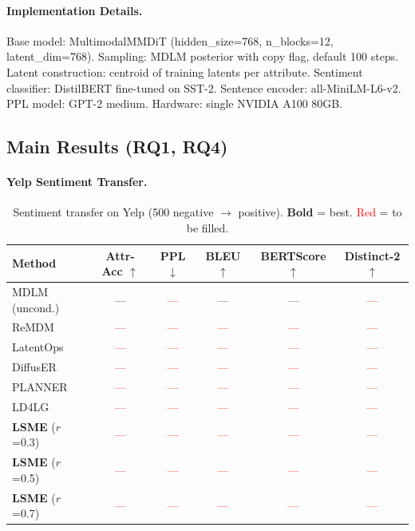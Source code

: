 \documentclass{article}
\newcommand{\tbd}[1]{\textcolor{red}{#1}}  %
\newcommand{\best}[1]{\textbf{#1}}          %
\begin{document}
\paragraph{Implementation Details.}
Base model: MultimodalMMDiT (hidden\_size=768, n\_blocks=12, latent\_dim=768).
Sampling: MDLM posterior with copy flag, default 100 steps.
Latent construction: centroid of training latents per attribute.
Sentiment classifier: DistilBERT fine-tuned on SST-2.
Sentence encoder: all-MiniLM-L6-v2.
PPL model: GPT-2 medium.
Hardware: single NVIDIA A100 80GB.

\subsection{Main Results (RQ1, RQ4)}
\label{sec:main_results}


\paragraph{Yelp Sentiment Transfer.}

\begin{table}[t]
\centering
\caption{Sentiment transfer on Yelp (500 negative $\to$ positive). \best{Bold} = best. \tbd{Red} = to be filled.}
\label{tab:yelp_results}
\small
\begin{tabular}{lccccc}
\toprule
\textbf{Method} & \textbf{Attr-Acc} $\uparrow$ & \textbf{PPL} $\downarrow$ & \textbf{BLEU} $\uparrow$ & \textbf{BERTScore} $\uparrow$ & \textbf{Distinct-2} $\uparrow$ \\
\midrule
MDLM (uncond.) & --- & \tbd{---} & --- & --- & \tbd{---} \\
ReMDM & \tbd{---} & \tbd{---} & \tbd{---} & \tbd{---} & \tbd{---} \\
LatentOps & \tbd{---} & \tbd{---} & \tbd{---} & \tbd{---} & \tbd{---} \\
DiffusER & \tbd{---} & \tbd{---} & \tbd{---} & \tbd{---} & \tbd{---} \\
PLANNER & \tbd{---} & \tbd{---} & \tbd{---} & \tbd{---} & \tbd{---} \\
LD4LG & \tbd{---} & \tbd{---} & \tbd{---} & \tbd{---} & \tbd{---} \\
\midrule
\textbf{LSME} ($r$=0.3) & \tbd{---} & \tbd{---} & \tbd{---} & \tbd{---} & \tbd{---} \\
\textbf{LSME} ($r$=0.5) & \tbd{---} & \tbd{---} & \tbd{---} & \tbd{---} & \tbd{---} \\
\textbf{LSME} ($r$=0.7) & \tbd{---} & \tbd{---} & \tbd{---} & \tbd{---} & \tbd{---} \\
\bottomrule
\end{tabular}
\end{table}
\end{document}
